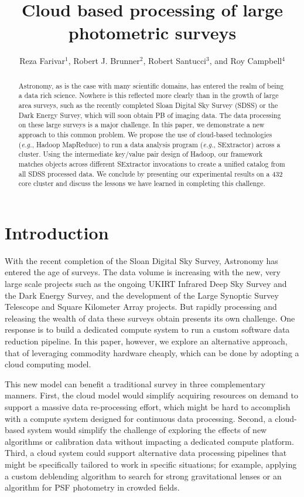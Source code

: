 \documentclass[11pt,twoside]{article}
\begin{document}
\title{Cloud based processing of large photometric surveys}
\author{Reza Farivar$^1$, Robert J. Brunner$^2$, Robert Santucci$^3$, and Roy Campbell$^4$
}

\begin{abstract}

Astronomy, as is the case with many scientific domains, has entered the realm of being a data rich science. Nowhere is this reflected more clearly than in the growth of large area surveys, such as the recently completed Sloan Digital Sky Survey (SDSS) or the Dark Energy Survey, which will soon obtain PB of imaging data. The data processing on these large surveys is a major challenge.
In this paper, we demonstrate a new approach to this common problem. We propose the use of cloud-based technologies (\textit{e.g.}, Hadoop MapReduce) to run a data analysis program (\textit{e.g.}, SExtractor) across a cluster.
Using the intermediate key/value pair design of Hadoop, our framework matches objects across different SExtractor invocations to create a unified catalog from all SDSS processed data. We conclude by presenting our experimental results on a 432 core cluster and discuss the lessons we have learned in completing this challenge.
\end{abstract}

\section{Introduction}
With the recent completion of the Sloan Digital Sky Survey, Astronomy has entered the age of surveys. The data volume is increasing with the new, very large scale projects such as the ongoing UKIRT Infrared Deep Sky Survey and the Dark Energy Survey, and the development of the Large Synoptic Survey Telescope and Square Kilometer Array projects. But rapidly processing and releasing the wealth of data these surveys obtain presents its own challenge. One response is to build a dedicated compute system to run a custom software data reduction pipeline. In this paper, however, we explore an alternative approach, that of leveraging commodity hardware cheaply, which can be done by adopting a cloud computing model. 

This new model can benefit a traditional survey in three complementary manners. 
First, the cloud model would simplify acquiring resources on demand to support a massive data re-processing effort, which might be hard to accomplish with a compute system designed for continuous data processing. 
Second, a cloud-based system would simplify the challenge of exploring the effects of new algorithms or calibration data without impacting a dedicated compute platform. 
Third, a cloud system could support alternative data processing pipelines that might be specifically tailored to work in specific situations; for example, applying a custom deblending algorithm to search for strong gravitational lenses or an algorithm for PSF photometry in crowded fields. 
\end{document}
